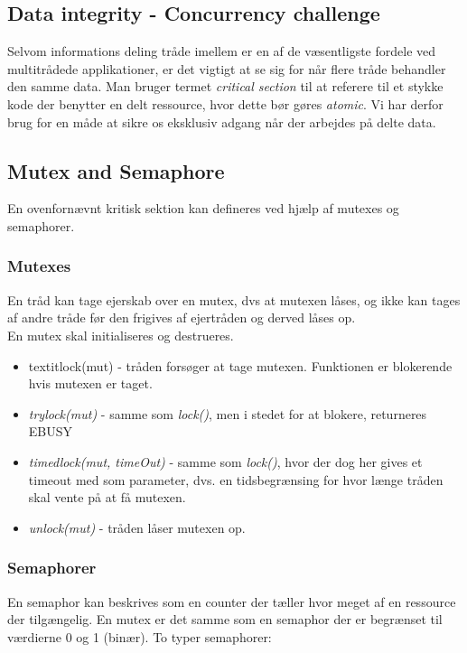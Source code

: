 \newpage

\subsection{Data integrity - Concurrency challenge}

Selvom informations deling tråde imellem er en af de væsentligste fordele ved multitrådede applikationer, er det vigtigt at se sig for når flere tråde behandler den samme data.
Man bruger termet \textit{critical section} til at referere til et stykke kode der benytter en delt ressource, hvor dette bør gøres \textit{atomic}. Vi har derfor brug for en måde at sikre os eksklusiv adgang når der arbejdes på delte data.

\subsection{Mutex and Semaphore}

En ovenfornævnt kritisk sektion kan defineres ved hjælp af mutexes og semaphorer.

\subsubsection{Mutexes}

En tråd kan tage ejerskab over en mutex, dvs at mutexen låses, og ikke kan tages af andre tråde før den frigives af ejertråden og derved låses op. \\

En mutex skal initialiseres og destrueres.

\begin{itemize}
	\item textit{lock(mut)} - tråden forsøger at tage mutexen. Funktionen er blokerende hvis mutexen er taget.
	\item \textit{trylock(mut)} - samme som \textit{lock()}, men i stedet for at blokere, returneres EBUSY
	\item \textit{timedlock(mut, timeOut)} - samme som \textit{lock()}, hvor der dog her gives et timeout med som parameter, dvs. en tidsbegrænsing for hvor længe tråden skal vente på at få mutexen.
	\item \textit{unlock(mut)} - tråden låser mutexen op. 
\end{itemize}

\subsubsection{Semaphorer}
En semaphor kan beskrives som en counter der tæller hvor meget af en ressource der tilgængelig.
En mutex er det samme som en semaphor der er begrænset til værdierne 0 og 1 (binær).
To typer semaphorer:

